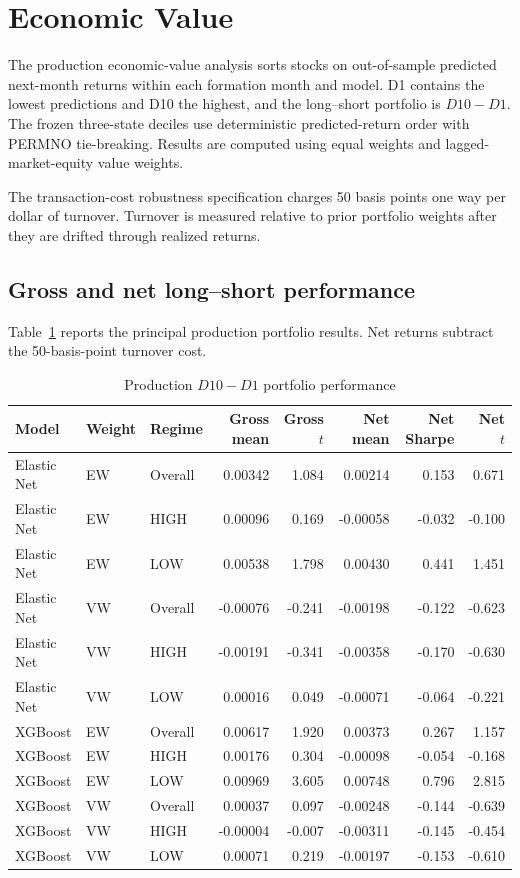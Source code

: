 \section{Economic Value}

The production economic-value analysis sorts stocks on out-of-sample predicted next-month returns within each formation month and model. D1 contains the lowest predictions and D10 the highest, and the long--short portfolio is $D10-D1$. The frozen three-state deciles use deterministic predicted-return order with PERMNO tie-breaking. Results are computed using equal weights and lagged-market-equity value weights.

The transaction-cost robustness specification charges 50 basis points one way per dollar of turnover. Turnover is measured relative to prior portfolio weights after they are drifted through realized returns.

\subsection{Gross and net long--short performance}

Table~\ref{tab:portfolio-performance} reports the principal production portfolio results. Net returns subtract the 50-basis-point turnover cost.

\begin{table}[htbp]
\centering
\caption{Production $D10-D1$ portfolio performance}
\label{tab:portfolio-performance}
{\small
\setlength{\tabcolsep}{3pt}
\begin{tabular}{lllrrrrr}
\hline
Model & Weight & Regime & Gross mean & Gross $t$ & Net mean & Net Sharpe & Net $t$ \\
\hline
Elastic Net & EW & Overall & 0.00342 & 1.084 &  0.00214 &  0.153 &  0.671 \\
Elastic Net & EW & HIGH    & 0.00096 & 0.169 & -0.00058 & -0.032 & -0.100 \\
Elastic Net & EW & LOW     & 0.00538 & 1.798 &  0.00430 &  0.441 &  1.451 \\
Elastic Net & VW & Overall & -0.00076 & -0.241 & -0.00198 & -0.122 & -0.623 \\
Elastic Net & VW & HIGH    & -0.00191 & -0.341 & -0.00358 & -0.170 & -0.630 \\
Elastic Net & VW & LOW     & 0.00016 & 0.049 & -0.00071 & -0.064 & -0.221 \\
XGBoost     & EW & Overall & 0.00617 & 1.920 &  0.00373 &  0.267 &  1.157 \\
XGBoost     & EW & HIGH    & 0.00176 & 0.304 & -0.00098 & -0.054 & -0.168 \\
XGBoost     & EW & LOW     & 0.00969 & 3.605 &  0.00748 &  0.796 &  2.815 \\
XGBoost     & VW & Overall & 0.00037 & 0.097 & -0.00248 & -0.144 & -0.639 \\
XGBoost     & VW & HIGH    & -0.00004 & -0.007 & -0.00311 & -0.145 & -0.454 \\
XGBoost     & VW & LOW     & 0.00071 & 0.219 & -0.00197 & -0.153 & -0.610 \\
\hline
\end{tabular}
}
\end{table}

